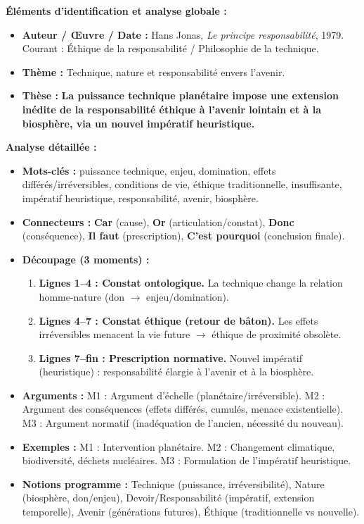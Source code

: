\documentclass[11pt]{article}
\newcommand{\cle}[1]{{\popxbold\color{popdark}#1}}
\begin{document}
\begin{exoresolu}
\textbf{Éléments d'identification et analyse globale :}
\begin{itemize}
    \item \textbf{Auteur / Œuvre / Date :} Hans Jonas, \emph{Le principe responsabilité}, 1979. Courant : Éthique de la responsabilité / Philosophie de la technique.
    \item \textbf{Thème :} \cle{Technique}, nature et responsabilité envers l'avenir.
    \item \textbf{Thèse :} \textbf{La puissance technique planétaire impose une extension inédite de la responsabilité éthique à l'avenir lointain et à la biosphère, via un nouvel impératif heuristique.}
\end{itemize}
\tcblower
\textbf{Analyse détaillée :}
\begin{itemize}
    \item \textbf{Mots-clés :} puissance technique, enjeu, domination, effets différés/irréversibles, conditions de vie, éthique traditionnelle, insuffisante, impératif heuristique, responsabilité, avenir, biosphère.
    \item \textbf{Connecteurs :} \textbf{Car} (cause), \textbf{Or} (articulation/constat), \textbf{Donc} (conséquence), \textbf{Il faut} (prescription), \textbf{C'est pourquoi} (conclusion finale).
    \item \textbf{Découpage (3 moments) :}
    \begin{enumerate}
        \item \textbf{Lignes 1--4 : Constat ontologique.} La technique change la relation homme-nature (don $\rightarrow$ enjeu/domination).
        \item \textbf{Lignes 4--7 : Constat éthique (retour de bâton).} Les effets irréversibles menacent la vie future $\rightarrow$ éthique de proximité obsolète.
        \item \textbf{Lignes 7--fin : Prescription normative.} Nouvel impératif (heuristique) : responsabilité élargie à l'avenir et à la biosphère.
    \end{enumerate}
    \item \textbf{Arguments :} M1 : Argument d'échelle (planétaire/irréversible). M2 : Argument des conséquences (effets différés, cumulés, menace existentielle). M3 : Argument normatif (inadéquation de l'ancien, nécessité du nouveau).
    \item \textbf{Exemples :} M1 : Intervention planétaire. M2 : Changement climatique, biodiversité, déchets nucléaires. M3 : Formulation de l'impératif heuristique.
    \item \textbf{Notions programme :} \cle{Technique} (puissance, irréversibilité), \cle{Nature} (biosphère, don/enjeu), \cle{Devoir}/\cle{Responsabilité} (impératif, extension temporelle), \cle{Avenir} (générations futures), \cle{Éthique} (traditionnelle vs nouvelle).
\end{itemize}
\end{exoresolu}
\end{document}
